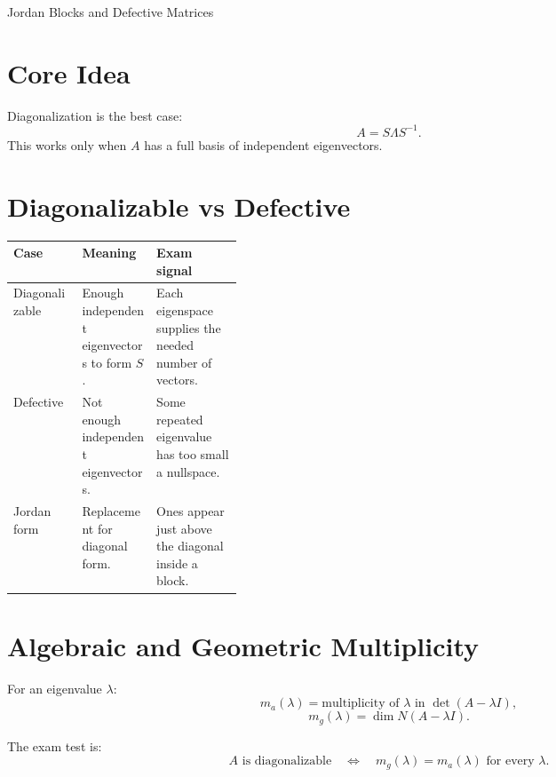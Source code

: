 \documentclass[10pt]{article}
\begin{document}
\begin{center}
{\LARGE Jordan Blocks and Defective Matrices\par}
\end{center}

\section{Core Idea}


Diagonalization is the best case:
\[
A=S\Lambda S^{-1}.
\]
This works only when \(A\) has a full basis of independent eigenvectors.

\section{Diagonalizable vs Defective}

\begin{center}
\small
\begin{tabularx}{\linewidth}{@{}L{0.30\linewidth}Y Y@{}}
\toprule
Case & Meaning & Exam signal \\
\midrule
Diagonalizable & Enough independent eigenvectors to form \(S\). & Each eigenspace supplies the needed number of vectors. \\
Defective & Not enough independent eigenvectors. & Some repeated eigenvalue has too small a nullspace. \\
Jordan form & Replacement for diagonal form. & Ones appear just above the diagonal inside a block. \\
\bottomrule
\end{tabularx}
\end{center}

\section{Algebraic and Geometric Multiplicity}

For an eigenvalue \(\lambda\):
\[
m_a(\lambda)=\text{multiplicity of }\lambda\text{ in }\det(A-\lambda I),
\]
\[
m_g(\lambda)=\dim N(A-\lambda I).
\]

The exam test is:
\[
A\text{ is diagonalizable}
\quad\Longleftrightarrow\quad
m_g(\lambda)=m_a(\lambda)\text{ for every }\lambda.
\]
\end{document}
